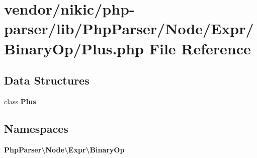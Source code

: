 \section{vendor/nikic/php-\/parser/lib/\+Php\+Parser/\+Node/\+Expr/\+Binary\+Op/\+Plus.php File Reference}
\label{_binary_op_2_plus_8php}
\subsection*{Data Structures}
\begin{DoxyCompactItemize}
\item 
class {\bf Plus}
\end{DoxyCompactItemize}
\subsection*{Namespaces}
\begin{DoxyCompactItemize}
\item 
 {\bf Php\+Parser\textbackslash{}\+Node\textbackslash{}\+Expr\textbackslash{}\+Binary\+Op}
\end{DoxyCompactItemize}

